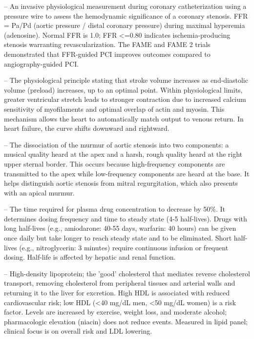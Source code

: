 -- An invasive physiological measurement during coronary catheterization using a pressure wire to assess the hemodynamic significance of a coronary stenosis. FFR = Pa/Pd (aortic pressure / distal coronary pressure) during maximal hyperemia (adenosine). Normal FFR is 1.0; FFR <=0.80 indicates ischemia-producing stenosis warranting revascularization. The FAME and FAME 2 trials demonstrated that FFR-guided PCI improves outcomes compared to angiography-guided PCI.

-- The physiological principle stating that stroke volume increases as end-diastolic volume (preload) increases, up to an optimal point. Within physiological limits, greater ventricular stretch leads to stronger contraction due to increased calcium sensitivity of myofilaments and optimal overlap of actin and myosin. This mechanism allows the heart to automatically match output to venous return. In heart failure, the curve shifts downward and rightward.

-- The dissociation of the murmur of aortic stenosis into two components: a musical quality heard at the apex and a harsh, rough quality heard at the right upper sternal border. This occurs because high-frequency components are transmitted to the apex while low-frequency components are heard at the base. It helps distinguish aortic stenosis from mitral regurgitation, which also presents with an apical murmur.

-- The time required for plasma drug concentration to decrease by 50\%. It determines dosing frequency and time to steady state (4-5 half-lives). Drugs with long half-lives (e.g., amiodarone: 40-55 days, warfarin: 40 hours) can be given once daily but take longer to reach steady state and to be eliminated. Short half-lives (e.g., nitroglycerin: 3 minutes) require continuous infusion or frequent dosing. Half-life is affected by hepatic and renal function.

-- High-density lipoprotein; the 'good' cholesterol that mediates reverse cholesterol transport, removing cholesterol from peripheral tissues and arterial walls and returning it to the liver for excretion. High HDL is associated with reduced cardiovascular risk; low HDL (<40 mg/dL men, <50 mg/dL women) is a risk factor. Levels are increased by exercise, weight loss, and moderate alcohol; pharmacologic elevation (niacin) does not reduce events. Measured in lipid panel; clinical focus is on overall risk and LDL lowering.

